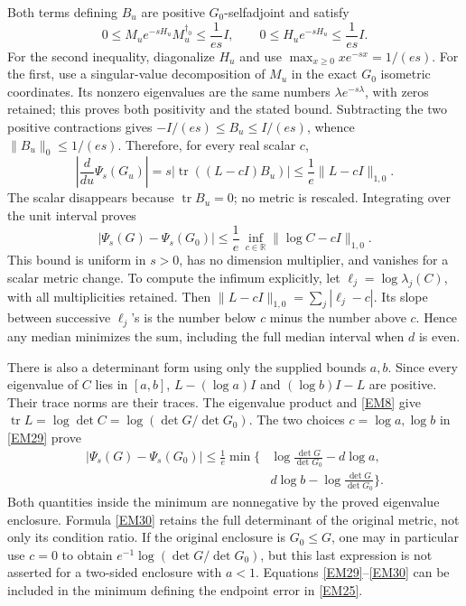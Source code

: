 \documentclass[11pt]{article}
\newcommand{\tr}{\operatorname{tr}}
\newcommand{\adjzero}{\dagger_0}
\begin{document}
Both terms defining \(B_u\) are positive \(G_0\)-selfadjoint and satisfy
\[
 0\le M_u e^{-sH_u}M_u^{\adjzero}\le\frac1{es}I,\qquad
 0\le H_u e^{-sH_u}\le\frac1{es}I.
\]
For the second inequality, diagonalize \(H_u\) and use
\(\max_{x\ge0}x e^{-sx}=1/(es)\).
For the first, use a singular-value decomposition of \(M_u\) in the
exact \(G_0\) isometric coordinates. Its nonzero eigenvalues are
the same numbers \(\lambda e^{-s\lambda}\), with zeros retained;
this proves both positivity and the stated bound.
Subtracting the two positive contractions gives
\(-I/(es)\le B_u\le I/(es)\), whence \(\|B_u\|_0\le1/(es)\).
Therefore, for every real scalar \(c\),
\[
 \left|\frac{d}{du}\Psi_s(G_u)\right|
  =s|\tr((L-cI)B_u)|
  \le\frac1e\|L-cI\|_{1,0}.
\]
The scalar disappears because \(\tr B_u=0\); no metric is rescaled.
Integrating over the unit interval proves
\begin{equation}
 |\Psi_s(G)-\Psi_s(G_0)|
 \le\frac1e\,\inf_{c\in\mathbb R}\|\log C-cI\|_{1,0}.
 \tag{EM29}\label{EM29}
\end{equation}
This bound is uniform in \(s>0\), has no dimension multiplier, and
vanishes for a scalar metric change. To compute the infimum explicitly,
let \(\ell_j=\log\lambda_j(C)\), with all multiplicities retained.
Then \(\|L-cI\|_{1,0}=\sum_j|\ell_j-c|\). Its slope between successive
\(\ell_j\)'s is the number below \(c\) minus the number above \(c\).
Hence any median minimizes the sum, including the full median interval
when \(d\) is even.

There is also a determinant form using only the supplied bounds
\(a,b\). Since every eigenvalue of \(C\) lies in \([a,b]\),
\(L-(\log a)I\) and \((\log b)I-L\) are positive. Their trace norms
are their traces. The eigenvalue product and \eqref{EM8} give
\(\tr L=\log\det C=\log(\det G/\det G_0)\). The two choices
\(c=\log a,\log b\) in \eqref{EM29} prove
\begin{equation}
 \begin{split}
 |\Psi_s(G)-\Psi_s(G_0)|\le\frac1e\min\biggl\{
 &\log\frac{\det G}{\det G_0}-d\log a,\\
 &d\log b-\log\frac{\det G}{\det G_0}\biggr\}.
 \end{split}
 \tag{EM30}\label{EM30}
\end{equation}
Both quantities inside the minimum are nonnegative by the proved
eigenvalue enclosure. Formula \eqref{EM30} retains the full determinant
of the original metric, not only its condition ratio. If the original
enclosure is \(G_0\le G\), one may in particular use \(c=0\) to obtain
\(e^{-1}\log(\det G/\det G_0)\), but this last expression is not asserted
for a two-sided enclosure with \(a<1\).
Equations \eqref{EM29}--\eqref{EM30} can be included in the minimum
defining the endpoint error in \eqref{EM25}.
\end{document}
